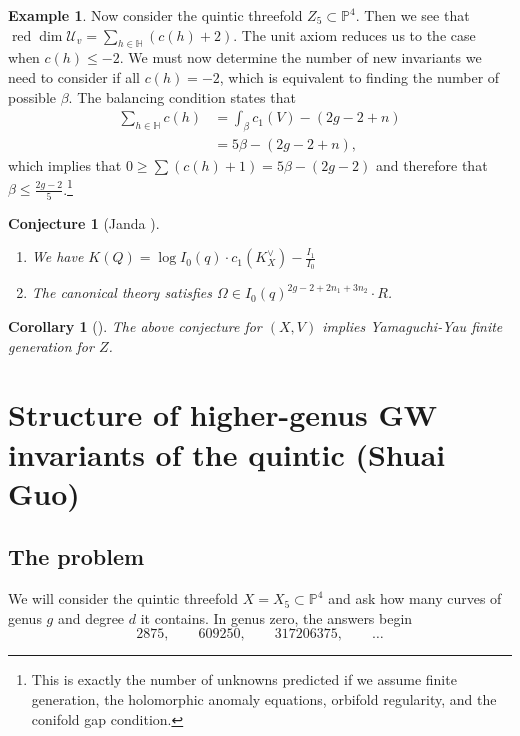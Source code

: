 \documentclass{amsart}
\newtheorem{cor}[thm]{Corollary}
\newtheorem{conj}[thm]{Conjecture}
\theoremstyle{definition}
\newtheorem{exm}[thm]{Example}
\theoremstyle{remark}
\theoremstyle{plain}
\theoremstyle{definition}
\theoremstyle{remark}
\renewcommand{\H}{\mathbb{H}}
\renewcommand{\P}{\mathbb{P}}
\newcommand{\mc}[1]{\mathcal{#1}}
\newcommand{\on}[1]{\operatorname{#1}}
\newcommand{\1}{\mathbf{1}}
\newcommand{\2}{\mathbf{2}}
\newcommand{\3}{\mathbf{3}}
\begin{document}
\begin{exm}
    Now consider the quintic threefold \(Z_5 \subset \P^4\). Then we see that \(\on{red}\dim \mc{U}_v = \sum_{h \in \H} (c(h)+2)\). The unit axiom reduces us to the case when \(c(h) \leq -2\). We must now determine the number of new invariants we need to consider if all \(c(h) = -2\), which is equivalent to finding the number of possible \(\beta\). The balancing condition states that
    \begin{align*}
        \sum_{h \in \H} c(h) &= \int_{\beta} c_1(V) - (2g-2+n) \\
        &= 5\beta - (2g-2+n),
    \end{align*}
    which implies that \(0 \geq \sum (c(h)+1) = 5\beta - (2g-2)\) and therefore that \(\beta \leq \frac{2g-2}{5}\).\footnote{This is exactly the number of unknowns predicted if we assume finite generation, the holomorphic anomaly equations, orbifold regularity, and the conifold gap condition.}
\end{exm}

\begin{conj}[Janda {\cite[Conjecture~1.6]{CJRtropical2025}}]\leavevmode
    \begin{enumerate}
        \item We have \(K(Q) = \log I_0(q) \cdot c_1(K_X^{\vee}) - \frac{I_1}{I_0}\) \\
        \item The canonical theory satisfies \(\Omega \in I_0(q)^{2g-2+2n_1 + 3 n_2} \cdot R\). 
    \end{enumerate}
\end{conj}

\begin{cor}[{\cite[Theorem~1.7]{CJRtropical2025}}]
    The above conjecture for \((X, V)\) implies Yamaguchi-Yau finite generation for \(Z\).
\end{cor}

\section{Structure of higher-genus GW invariants of the quintic (Shuai Guo)}%
\label{sec:Structure of higher-genus GW invariants of the quintic (Shuai Guo)}

\subsection{The problem}%
\label{sub:The problem (Guo)}

We will consider the quintic threefold \(X = X_5 \subset \P^4\) and ask how many curves of genus \(g\) and degree \(d\) it contains. In genus zero, the answers begin
\[ 2875, \qquad 609250, \qquad 317206375, \qquad \ldots \]
\end{document}
